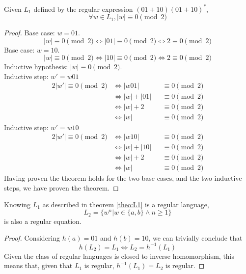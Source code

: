 \documentclass[docid=CA06]{tcom_CA}
\begin{document}
\setcounter{chapter}{5}
{

\begin{theorem}\label{theo:L1}
Given $L_1$ defined by the regular expression $(01+10)(01+10)^*$,
\begin{equation*}
	\forall w \in L_1, |w| \equiv 0 \pmod{2}
\end{equation*}
\end{theorem}
\begin{proof}
Base case: $w=01$.
\begin{equation*}
	|w| \equiv 0 \pmod{2} \iff |01| \equiv 0 \pmod{2} \iff 2 \equiv 0 \pmod{2}
\end{equation*}
Base case: $w=10$.
\begin{equation*}
	|w| \equiv 0 \pmod{2} \iff |10| \equiv 0 \pmod{2} \iff 2 \equiv 0 \pmod{2}
\end{equation*}
Inductive hypothesis: $|w| \equiv 0 \pmod{2}$.\\
Inductive step: $w'=w01$
\begin{alignat*}{2}
	|w'| \equiv 0 \pmod{2}
	&\iff |w01|    &&\equiv 0 \pmod{2}\\
	&\iff |w|+|01| &&\equiv 0 \pmod{2}\\
	&\iff |w|+2    &&\equiv 0 \pmod{2}\\
	&\iff |w|      &&\equiv 0 \pmod{2}
\end{alignat*}
Inductive step: $w'=w10$
\begin{alignat*}{2}
	|w'| \equiv 0 \pmod{2}
	&\iff |w10|    &&\equiv 0 \pmod{2}\\
	&\iff |w|+|10| &&\equiv 0 \pmod{2}\\
	&\iff |w|+2    &&\equiv 0 \pmod{2}\\
	&\iff |w|      &&\equiv 0 \pmod{2}
\end{alignat*}
Having proven the theorem holds for the two base cases, and the two inductive steps, we have proven the theorem.
\end{proof}
\begin{theorem}
	Knowing $L_1$ as described in theorem \ref{theo:L1} is a regular language,
	\begin{equation*}
		L_2 = \{w^n | w \in \{a,b\} \wedge n \geq 1 \}
	\end{equation*}
	is also a regular equation.
\end{theorem}
\begin{proof}
Considering $h(a)=01$ and $h(b)=10$, we can trivially conclude that
\begin{equation*}
	h(L_2)=L_1 \iff L_2 = h^{-1}(L_1)
\end{equation*}
Given the class of regular languages is closed to inverse homomorphism, this means that, given that $L_1$ is regular, $h^{-1}(L_1)=L_2$ is regular.
\end{proof}
}
\end{document}
